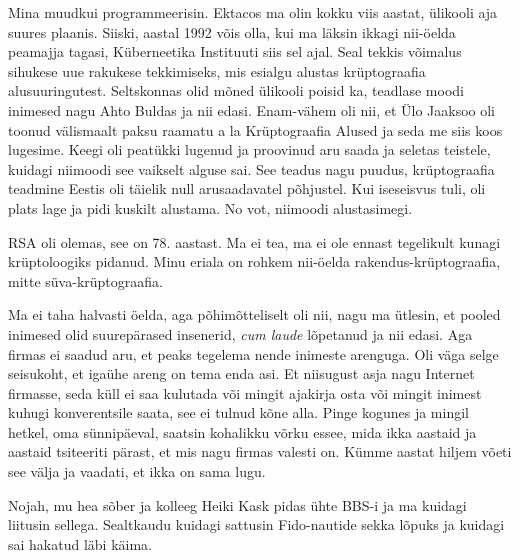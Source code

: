 
Mina muudkui programmeerisin. Ektacos ma olin kokku viis aastat, ülikooli aja suures plaanis. Siiski, aastal 1992  võis olla,  kui ma läksin ikkagi nii-öelda peamajja tagasi,  Küberneetika Instituuti siis sel ajal. Seal tekkis võimalus sihukese uue rakukese tekkimiseks, mis esialgu alustas krüptograafia alusuuringutest. Seltskonnas olid mõned ülikooli  poisid ka,  teadlase moodi inimesed nagu Ahto Buldas ja nii edasi.  Enam-vähem oli nii, et  Ülo Jaaksoo oli toonud välismaalt paksu raamatu a la Krüptograafia Alused ja seda me siis koos lugesime. Keegi oli peatükki lugenud ja proovinud aru saada ja  seletas teistele, kuidagi niimoodi see vaikselt alguse sai. See teadus nagu puudus, krüptograafia teadmine Eestis oli täielik null arusaadavatel põhjustel. Kui iseseisvus tuli, oli plats lage ja pidi kuskilt alustama. No vot, niimoodi alustasimegi. 


RSA oli olemas, see on 78. aastast. Ma ei tea, ma ei ole ennast tegelikult kunagi krüptoloogiks pidanud. Minu eriala on rohkem  nii-öelda rakendus-krüptograafia, mitte  süva-krüptograafia.


Ma ei taha halvasti öelda, aga põhimõtteliselt oli nii, nagu ma ütlesin, et pooled inimesed olid suurepärased insenerid, \emph{cum laude} lõpetanud ja nii edasi. Aga firmas ei saadud aru, et  peaks tegelema nende inimeste arenguga. Oli väga selge seisukoht, et igaühe areng on tema enda asi. Et niisugust asja nagu Internet firmasse, seda küll ei saa kulutada või mingit ajakirja osta või mingit inimest kuhugi konverentsile saata, see ei tulnud kõne alla. Pinge kogunes ja mingil hetkel, oma sünnipäeval,  saatsin kohalikku võrku essee, mida ikka aastaid ja aastaid tsiteeriti pärast, et  mis nagu firmas valesti on. Kümme aastat hiljem võeti see välja ja vaadati, et ikka on sama lugu. 


Nojah, mu hea sõber ja kolleeg Heiki Kask pidas ühte BBS-i ja ma kuidagi liitusin sellega. Sealtkaudu kuidagi sattusin  Fido-nautide sekka lõpuks ja kuidagi sai hakatud läbi käima. 


